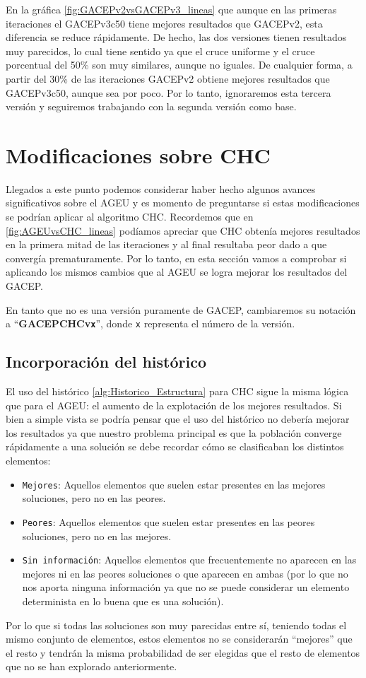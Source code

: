 En la gráfica \ref{fig:GACEPv2vsGACEPv3_lineas} que aunque en las primeras iteraciones el GACEPv3c50 tiene mejores resultados que GACEPv2, esta diferencia se reduce rápidamente. 
De hecho, las dos versiones tienen resultados muy parecidos, lo cual tiene sentido ya que el cruce uniforme y el cruce porcentual del 50\% son muy similares, aunque no iguales. 
De cualquier forma, a partir del 30\% de las iteraciones GACEPv2 obtiene mejores resultados que GACEPv3c50, aunque sea por poco. 
Por lo tanto, ignoraremos esta tercera versión y seguiremos trabajando con la segunda versión como base. 

\section{Modificaciones sobre CHC}

Llegados a este punto podemos considerar haber hecho algunos avances significativos sobre el AGEU y es momento de preguntarse si estas modificaciones se podrían aplicar al algoritmo CHC. 
Recordemos que en \ref{fig:AGEUvsCHC_lineas} podíamos apreciar que CHC obtenía mejores resultados en la primera mitad de las iteraciones y al final resultaba peor dado a que convergía prematuramente. 
Por lo tanto, en esta sección vamos a comprobar si aplicando los mismos cambios que al AGEU se logra mejorar los resultados del GACEP. 

En tanto que no es una versión puramente de GACEP, cambiaremos su notación a ``\textbf{GACEPCHCv\texttt{x}}'', donde \texttt{x} representa el número de la versión. 

\subsection{Incorporación del histórico}

El uso del histórico \ref{alg:Historico_Estructura} para CHC sigue la misma lógica que para el AGEU: el aumento de la explotación de los mejores resultados. 
Si bien a simple vista se podría pensar que el uso del histórico no debería mejorar los resultados ya que nuestro problema principal es que la población converge rápidamente a una solución se debe recordar cómo se clasificaban los distintos elementos:
\begin{itemize}
	\item \texttt{Mejores}: Aquellos elementos que suelen estar presentes en las mejores soluciones, pero no en las peores.
	\item \texttt{Peores}: Aquellos elementos que suelen estar presentes en las peores soluciones, pero no en las mejores. 
	\item \texttt{Sin información}: Aquellos elementos que frecuentemente no aparecen en las mejores ni en las peores soluciones o que aparecen en ambas (por lo que no nos aporta ninguna información ya que no se puede considerar un elemento determinista en lo buena que es una solución).
\end{itemize}
Por lo que si todas las soluciones son muy parecidas entre sí, teniendo todas el mismo conjunto de elementos, estos elementos no se considerarán ``mejores'' que el resto y tendrán la misma probabilidad de ser elegidas que el resto de elementos que no se han explorado anteriormente. 

